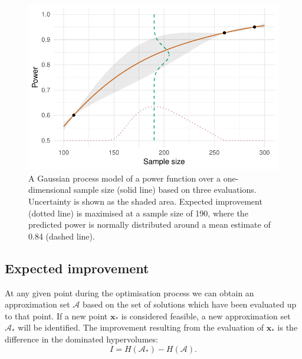 \documentclass{article} %
\begin{document}
\begin{figure}
\centering
\includegraphics[scale=0.8]{./Figures/GP_example}
\caption{A Gaussian process model of a power function over a one-dimensional sample size (solid line) based on three evaluations. Uncertainty is shown as the shaded area. Expected improvement (dotted line) is maximised at a sample size of 190, where the predicted power is normally distributed around a mean estimate of 0.84 (dashed line).}
\label{fig:GP_example}
\end{figure}


\subsection{Expected improvement}\label{sec:EGO}

At any given point during the optimisation process we can obtain an approximation set $\mathcal{A}$ based on the set of solutions which have been evaluated up to that point. If a new point $\mathbf{x}_{*}$ is considered feasible, a new approximation set $\mathcal{A}_{*}$ will be identified. The improvement resulting from the evaluation of $\mathbf{x}_{*}$ is the difference in the dominated hypervolumes:
\begin{equation}
I = H(\mathcal{A}_{*}) - H(\mathcal{A}).
\end{equation}
\end{document}
